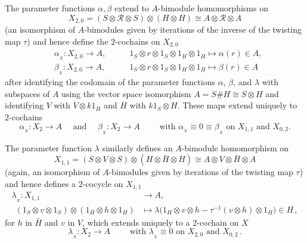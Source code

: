 \documentclass[11pt]{amsart}
\numberwithin{equation}{section}
\newcommand{\X}{_X}
\newcommand{\alphax}{\alpha_{\X}}
\newcommand{\betax}{\beta_{\X}}
\newcommand{\lambdax}{\lambda_{\X}}
\newcommand{\A}{A}%
\newcommand{\sA}{A }
\newcommand{\R}{\mathcal{R}}
\renewcommand{\_}[1]{\mbox{$_{\left( #1 \right)}$}}
\newcommand{\ot}{\otimes}
\newcommand{\Ho}{H}%
\begin{document}
{The parameter functions $\alpha,\beta$ extend to 
 $\A$-bimodule homomorphisms on 
$$X_{2,0}=(S\ot \R \ot S) 
\ot (\Ho\ot\Ho)
\cong \A\ot \R\ot \A
$$
(an isomorphism of 
$\A$-bimodules given by iterations of the inverse
of the twisting map $\tau$)
and hence
define the $2$-cochains on $X_{2,0}$
\begin{equation}\label{CochainAlpha}
 \begin{aligned}
   &\alphax:  X_{2,0}\longrightarrow \A,
   \qquad
 &1_S\ot r\ot 1_S
 \ot
 1_H\ot 1_H
 \longmapsto \alpha(r) \in \A, \\
 &\betax:  X_{2,0}\longrightarrow \A,
 \qquad
 &1_S\ot r\ot 1_S
 \ot
 1_H\ot 1_H \longmapsto \beta(r)\in \A
 \,  
 \end{aligned}
 \end{equation}
after identifying the codomain of the parameter functions $\alpha$, $\beta$,  
and $\lambda$ 
with subspaces of $A$ using the vector space
isomorphism $A=S\# H\cong S\ot H$ and identifying
$V$ with $V\ot k1_H$ and $H$ with $k1_S\ot H$.
These maps extend uniquely to 2-cochains 
 $$
 \alphax:  X_2\longrightarrow \A
 \quad\text{ and }\quad 
 \betax:  X_2\longrightarrow \A 
 \qquad\text{ 
 with $\alphax\equiv 0 \equiv \betax$ on $X_{1,1}$ and 
 $X_{0,2}$} . 
$$

The parameter function $\lambda$ similarly defines
an $A$-bimodule homomorphism on 
$$
X_{1,1}
=(S \ot V\ot S) \ot (\Ho\ot \bar H\ot \Ho)
\cong
A\ot V\ot \bar H \ot A
$$
(again, an  isomorphism of 
$A$-bimodules given by iterations of the twisting map $\tau$)
and hence defines a $2$-cocycle on $X_{1,1}$
\begin{equation}\label{CochainLambda}
 \begin{aligned}
\lambdax: X_{1,1} &\longrightarrow A,
\\ \ \ 
(1_S\ot v\ot 1_S)
\ot
(1_H\ot h\ot 1_H)
&\longmapsto
\lambda\big(1_H\ot v\ot h -\tau^{-1}(v\ot h)\ot 1_H\big)
\in H
\, ,
\end{aligned}
\end{equation}
for $h$ in $\bar H$ and $v$ in $V$, which extends uniquely to a $2$-cochain on $X$
$$
 \lambdax:  X_2\longrightarrow \A 
 \qquad\text{ 
 with $\lambdax\equiv 0$ on $X_{2,0}$ and 
 $X_{0,2}$}
\, .
 $$

}
\end{document}
